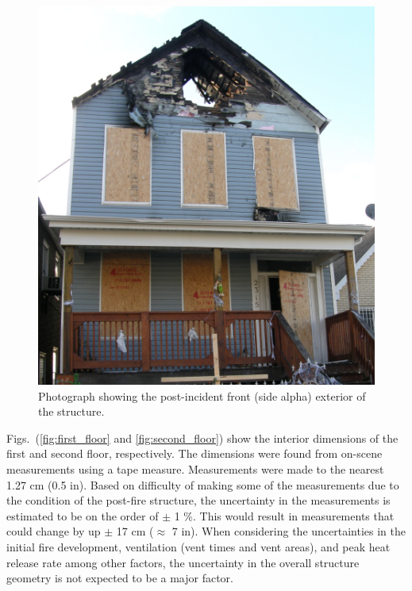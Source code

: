 \documentclass[11pt,oneside]{book}
\begin{document}
\begin{figure}[h!]
\centering
\includegraphics[width=.65\textwidth]{../Figures/exterior_alpha}
\caption{Photograph showing the post-incident front (side alpha) exterior of the structure.}
\label{fig:alpha_ex}
\end{figure}

Figs.~(\ref{fig:first_floor} and \ref{fig:second_floor}) show the interior dimensions of the first and second floor, respectively. The dimensions were found from on-scene measurements using a tape measure. Measurements were made to the nearest 1.27 cm (0.5 in). Based on difficulty of making some of the measurements due to the condition of the post-fire structure, the uncertainty in the measurements is estimated to be on the order of $\pm$ 1 \%. This would result in measurements that could change by up $\pm$ 17 cm ($\approx$ 7 in). When considering the uncertainties in the initial fire development, ventilation (vent times and vent areas), and peak heat release rate among other factors, the uncertainty in the overall structure geometry is not expected to be a major factor.

\end{document}
